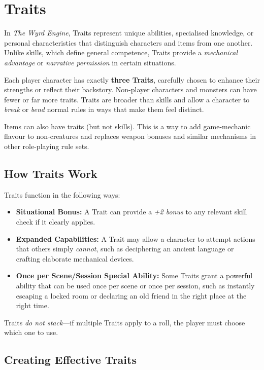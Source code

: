 \section{Traits}
\label{core:traits}

In \emph{The Wyrd Engine}, Traits represent unique abilities, specialised knowledge, or personal characteristics that distinguish characters and items from one another. Unlike skills, which define general competence, Traits provide a \emph{mechanical advantage} or \emph{narrative permission} in certain situations.

Each player character has exactly \textbf{three Traits}, carefully chosen to enhance their strengths or reflect their backstory. Non-player characters and monsters can have fewer or far more traits. Traits are broader than skills and allow a character to \emph{break} or \emph{bend} normal rules in ways that make them feel distinct.

Items can also have traits (but not skills). This is a way to add game-mechanic flavour to non-creatures and replaces weapon bonuses and similar mechanisms in other role-playing rule sets.

\subsection{How Traits Work}

Traits function in the following ways:

\begin{itemize}
    \item \textbf{Situational Bonus:} A Trait can provide a \emph{+2 bonus} to any relevant skill check if it clearly applies.
    \item \textbf{Expanded Capabilities:} A Trait may allow a character to attempt actions that others simply \emph{cannot}, such as deciphering an ancient language or crafting elaborate mechanical devices.
    \item \textbf{Once per Scene/Session Special Ability:} Some Traits grant a powerful ability that can be used once per scene or once per session, such as instantly escaping a locked room or declaring an old friend in the right place at the right time.
\end{itemize}

Traits \emph{do not stack}—if multiple Traits apply to a roll, the player must choose which one to use.

\subsection{Creating Effective Traits}

